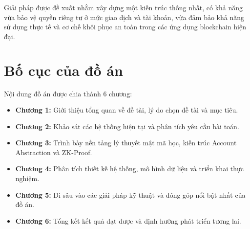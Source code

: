 \documentclass[../DoAn.tex]{subfiles}
\begin{document}
Giải pháp được đề xuất nhằm xây dựng một kiến trúc thống nhất, có khả năng vừa bảo vệ quyền riêng tư ở mức giao dịch và tài khoản, vừa đảm bảo khả năng sử dụng thực tế và cơ chế khôi phục an toàn trong các ứng dụng blockchain hiện đại.
\section{Bố cục của đồ án}
Nội dung đồ án được chia thành 6 chương:
\begin{itemize}
    \item \textbf{Chương 1:} Giới thiệu tổng quan về đề tài, lý do chọn đề tài và mục tiêu.
    \item \textbf{Chương 2:} Khảo sát các hệ thống hiện tại và phân tích yêu cầu bài toán.
    \item \textbf{Chương 3:} Trình bày nền tảng lý thuyết mật mã học, kiến trúc Account Abstraction và ZK-Proof.
    \item \textbf{Chương 4:} Phân tích thiết kế hệ thống, mô hình dữ liệu và triển khai thực nghiệm.
    \item \textbf{Chương 5:} Đi sâu vào các giải pháp kỹ thuật và đóng góp nổi bật nhất của đồ án.
    \item \textbf{Chương 6:} Tổng kết kết quả đạt được và định hướng phát triển tương lai.
\end{itemize}
\end{document}

